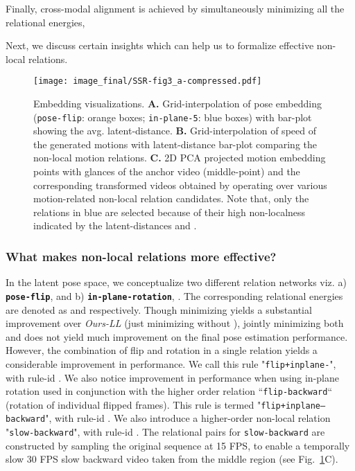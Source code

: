 \documentclass{article}
\begin{document}
\vspace{-1mm}
\noindent
\vspace{-4mm}

Finally, cross-modal alignment is achieved by simultaneously minimizing all the relational energies, \ie

\vspace{-4mm}
\noindent


Next, we discuss certain insights which can help us to formalize effective non-local relations. 


\begin{figure}[!t]\begin{center}
\texttt{[image: image\_final/SSR-fig3\_a-compressed.pdf]}
	\vspace{-4mm}
	\caption{ Embedding visualizations. \textbf{A.} Grid-interpolation of pose embedding (\texttt{pose-flip}: orange boxes; \texttt{in-plane-5}: blue boxes) with bar-plot showing the avg. latent-distance. 
\textbf{B.} Grid-interpolation of speed of the generated motions with latent-distance bar-plot comparing the non-local motion relations. \textbf{C.} 2D PCA projected motion embedding points with glances of the anchor video (middle-point) and the corresponding transformed videos obtained by operating over various motion-related non-local relation candidates. Note that, only the relations in blue are selected because of their high non-localness indicated by the latent-distances  and . 
	}
    \vspace{-5mm}
    \label{fig:embedding_vis}  
\end{center}
\end{figure}


\vspace{-1mm}
\subsubsection{What makes non-local relations more effective?}
\vspace{-2mm}


In the latent pose space, we conceptualize two different relation networks viz. a) \textbf{\texttt{pose-flip}},  and b) \textbf{\texttt{in-plane-rotation}}, . The corresponding relational energies are denoted as  and  respectively. Though minimizing  yields a substantial improvement over \textit{Ours-LL} (just minimizing  without ), jointly minimizing both  and  does not yield much improvement on the final pose estimation performance. However, the combination of flip and rotation in a single relation yields a considerable improvement in performance. We call this rule "\texttt{flip+inplane-}", with rule-id . We also notice improvement in performance when using in-plane rotation used in conjunction with the higher order relation ``\texttt{flip-backward}`` (rotation of individual flipped frames). This rule is termed "\texttt{flip+inplane--backward}", with rule-id . We also introduce a higher-order non-local relation "\texttt{slow-backward}", with rule-id . The relational pairs for \texttt{slow-backward} are constructed by sampling the original sequence at 15 FPS, to enable a temporally slow 30 FPS slow backward video taken from the middle region (see Fig.~\ref{fig:embedding_vis}{\color{red}C}).
\end{document}

